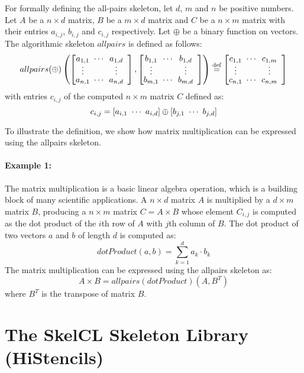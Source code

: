 For formally defining the all-pairs skeleton, let $d$, $m$ and $n$ be positive numbers.
  Let $A$ be a $n\times d$ matrix, $B$ be a $m\times d$ matrix and $C$ be a $n\times m$ matrix with their entries $a_{i,j}$, $b_{i,j}$ and $c_{i,j}$ respectively.
  Let $\oplus$ be a binary function on vectors. %
  The algorithmic skeleton $allpairs$ is defined as follows:
  \[
	  allpairs(\oplus)\left(\DottedMatrix{a_{1,1}}{a_{1,d}}{a_{n,1}}{a_{n,d}},%
	                           \DottedMatrix{b_{1,1}}{b_{1,d}}{b_{m,1}}{b_{m,d}}\right)%
  	\eqdef \DottedMatrix{c_{1,1}}{c_{1,m}}{c_{n,1}}{c_{n,m}}
  \]
  with entries $c_{i,j}$ of the computed $n\times m$ matrix $C$ defined as:
  \[
	  c_{i,j} = \left[a_{i,1}\ \cdots\ a_{i,d}\right] \oplus \left[b_{j,1}\ \cdots\ b_{j,d}\right]
  \]

To illustrate the definition, we show how matrix multiplication can be expressed using the allpairs skeleton.

\paragraph{Example 1:}
The matrix multiplication is a basic linear algebra operation, which is a building block of many scientific applications.
A $n\times d$ matrix $A$ is multiplied by a $d\times m$ matrix $B$, producing a $n\times m$ matrix $C=A\times B$ whose element $C_{i,j}$ is computed as the dot product of the $i$th row of $A$ with $j$th column of $B$.
The dot product of two vectors $a$ and $b$ of length $d$ is computed as:
\begin{equation}
  dotProduct(a,b) = \sum_{k=1}^d a_k \cdot b_k
\end{equation}
The matrix multiplication can be expressed using the allpairs skeleton as:
\begin{equation}
  A\times B = allpairs(dotProduct)\left(A, B^T\right)
  \label{eq:mat_mult_allpairs}
\end{equation}
where $B^T$ is the transpose of matrix $B$.






\section{The SkelCL Skeleton Library (HiStencils)}
\label{sec:skelcl}


